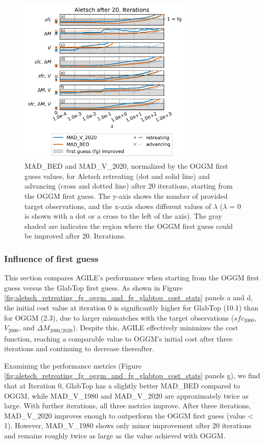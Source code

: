 \documentclass[journal abbreviation, manuscript]{copernicus}
\begin{document}
\begin{figure}
    \centering
    \includegraphics[width=8.3cm]{fig06.png}
    \caption{MAD\_BED and MAD\_V\_2020, normalized by the OGGM first guess values, for Aletsch retreating (dot and solid line) and advancing (cross and dotted line) after 20 iterations, starting from the OGGM first guess. The y-axis shows the number of provided target observations, and the x-axis shows different values of $\lambda$ ($\lambda$ = 0 is shown with a dot or a cross to the left of the axis). The gray shaded are indicates the region where the OGGM first guess could be improved after 20. Iterations.}
    \label{fig:aletsch_all_cost_fcts}
\end{figure}


\subsubsection{Influence of first guess}
\label{subsec:influence_fg_aletsch-retreating}

This section compares AGILE’s performance when starting from the OGGM first guess versus the GlabTop first guess. As shown in Figure \ref{fig:aletsch_retreating_fg_oggm_and_fg_glabtop_cost_stats} panels a and d, the initial cost value at iteration 0 is significantly higher for GlabTop (10.1) than for OGGM (2.3), due to larger mismatches with the target observations ($sfc_{2000}$, $V_{2000}$, and $\Delta M_{2000/2020}$). Despite this, AGILE effectively minimizes the cost function, reaching a comparable value to OGGM's initial cost after three iterations and continuing to decrease thereafter.

Examining the performance metrics (Figure \ref{fig:aletsch_retreating_fg_oggm_and_fg_glabtop_cost_stats} panels g), we find that at Iteration 0, GlabTop has a slightly better MAD\_BED compared to OGGM, while MAD\_V\_1980 and MAD\_V\_2020 are approximately twice as large. With further iterations, all three metrics improve. After three iterations, MAD\_V\_2020 improves enough to outperform the OGGM first guess (value < 1). However, MAD\_V\_1980 shows only minor improvement after 20 iterations and remains roughly twice as large as the value achieved with OGGM.
\end{document}
